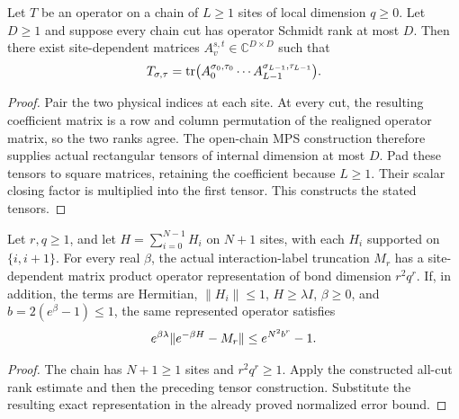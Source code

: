 \begin{lemma}
    \label{thm:operator_chain_from_all_cut_ranks}
    \leanok
    Let $T$ be an operator on a chain of $L\geq1$ sites of local
    dimension $q\geq0$. Let $D\geq1$ and suppose every chain cut
    has operator Schmidt rank at most $D$. Then there exist
    site-dependent matrices $A_v^{s,t}\in\mathbb C^{D\times D}$ such that
    \begin{align}
        T_{\sigma,\tau}
        =\operatorname{tr}\bigl(A_0^{\sigma_0,\tau_0}\cdots
        A_{L-1}^{\sigma_{L-1},\tau_{L-1}}\bigr).\notag
    \end{align}
\end{lemma}
\begin{proof}\leanok
    Pair the two physical indices at each site. At every cut, the
    resulting coefficient matrix is a row and column permutation
    of the realigned operator matrix, so the two ranks agree.
    The open-chain MPS construction therefore supplies actual
    rectangular tensors of internal dimension at most $D$.
    Pad these tensors to square matrices, retaining the coefficient
    because $L\geq1$. Their scalar closing factor is multiplied
    into the first tensor. This constructs the stated tensors.
\end{proof}

\begin{theorem}
    \label{thm:physical_cluster_label_mpo}
    \leanok
    Let $r,q\geq1$, and let $H=\sum_{i=0}^{N-1}H_i$ on $N+1$ sites,
    with each $H_i$ supported on $\{i,i+1\}$. For every real $\beta$,
    the actual interaction-label truncation $M_r$ has a site-dependent
    matrix product operator representation of bond dimension $r^2q^r$.
    If, in addition, the terms are Hermitian, $\|H_i\|\leq1$,
    $H\geq\lambda I$, $\beta\geq0$, and $b=2(e^\beta-1)\leq1$, the
    same represented operator satisfies
    \begin{align}
        e^{\beta\lambda}\|e^{-\beta H}-M_r\|
        \leq e^{N^2b^r}-1.\notag
    \end{align}
\end{theorem}
\begin{proof}\leanok
    The chain has $N+1\geq1$ sites and $r^2q^r\geq1$. Apply the
    constructed all-cut rank estimate and then the preceding tensor
    construction. Substitute the resulting exact representation in
    the already proved normalized error bound.
\end{proof}

